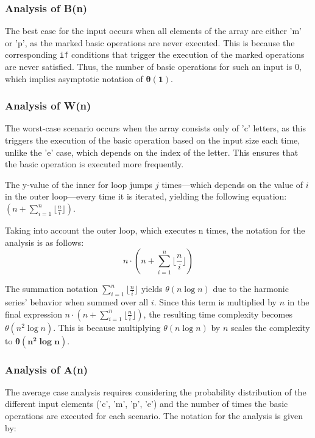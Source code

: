 \documentclass[11pt, oneside, a4paper]{article}
\begin{document}
	\subsubsection{Analysis of B(n)}
The best case for the input occurs when all elements of the array are either 'm' or 'p', as the marked basic operations are never executed. This is because the corresponding \texttt{if} conditions that trigger the execution of the marked operations are never satisfied. Thus, the number of basic operations for such an input is 0, which implies asymptotic notation of \(\boldsymbol{\theta(1)}\).

	\subsubsection{Analysis of W(n)}
 
The worst-case scenario occurs when the array consists only of 'c' letters, as this triggers the execution of the basic operation based on the input size each time, unlike the 'e' case, which depends on the index of the letter. This ensures that the basic operation is executed more frequently. 

The y-value of the inner for loop jumps \( j \) times—which depends on the value of \( i \) in the outer loop—every time it is iterated, yielding the following equation: \(( n +  \sum_{i=1}^{n} \lfloor\frac{n}{i} \rfloor)\).


\begin{flushleft}
Taking into account the outer loop, which executes n times, the notation for the analysis is as follows:
\[
n \cdot \left( n +  \sum_{i=1}^{n} \lfloor \frac{n}{i} \rfloor \right)
\]
\end{flushleft}
The summation notation \(\sum_{i=1}^{n} \lfloor \frac{n}{i} \rfloor\) yields \(\theta(n \log n)\) due to the harmonic series' behavior when summed over all \( i \). Since this term is multiplied by \( n \) in the final expression \( n \cdot \left( n + \sum_{i=1}^{n} \lfloor \frac{n}{i} \rfloor \right) \), the resulting time complexity becomes \(\theta(n^2 \log n)\). This is because multiplying \(\theta(n \log n)\) by \( n \) scales the complexity to \(\boldsymbol{\theta(n^2 \log n)}\).


	\subsubsection{Analysis of A(n)}
 The average case analysis requires considering the probability distribution of the different input elements ('c', 'm', 'p', 'e') and the number of times the basic operations are executed for each scenario. The notation for the analysis is given by:
\end{document}
